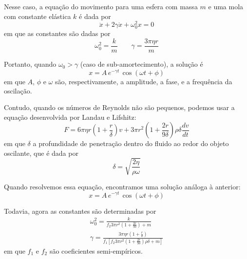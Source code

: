 \documentclass[a4paper, 12pt]{article}
\begin{document}
\begin{multicols}{2}
\begin{enumerate}
				\par Nesse caso, a equação do movimento para uma esfera com massa $m$ e uma mola com constante elástica $k$ é dada por
				\begin{equation}
					\ddot{x} + 2 \gamma \dot{x} + \omega_0^2 x = 0
				\end{equation}
				em que as constantes são dadas por
				\begin{equation}
					\omega_0^2 = \frac{k}{m} \qquad \gamma = \frac{3 \pi \eta r}{m}
				\end{equation}
				\par Portanto, quando $\omega_0 > \gamma$ (caso de sub-amortecimento), a solução é
				\begin{equation}
					x = A \, e^{- \gamma t} \, \cos (\omega t + \phi)
				\end{equation}
				em que $A$, $\phi$ e $\omega$ são, respectivamente, a amplitude, a fase, e a frequência da oscilação.
				\par Contudo, quando os números de Reynolds não são pequenos, podemos usar a equação desenvolvida por Landau e Lifshitz:
				\begin{equation}
					F = 6 \pi \eta r \left(1 + \frac{r}{\delta} \right) v + 3 \pi r^2 \left( 1 + \frac{2 r}{9 \delta} \right) \rho \delta \dfrac{d v}{d t}
				\end{equation}
				em que $\delta$ a profundidade de penetração dentro do fluido ao redor do objeto oscilante, que é dada por
				\begin{equation}
					\delta = \sqrt{\frac{2 \eta}{\rho \omega}}
				\end{equation}
				\par Quando resolvemos essa equação, encontramos uma solução análoga à anterior:
				\begin{equation}
					x = A \, e^{- \gamma t} \, \cos (\omega t + \phi)
				\end{equation}
				\par Todavia, agora as constantes são determinadas por
				\begin{equation} \begin{split}
					\omega_0^2 = \frac{k}{f_2 3 \pi r^2 \left(1 + \frac{2 r}{9 \delta} \right) + m} \\
					\gamma = \frac{3 \pi \eta r \left(1+ \frac{r}{\delta} \right)}{f_1 \left[ f_2 3 \pi r^2 \left(1+\frac{2 r}{9 \delta} \right) \rho \delta + m \right]}
				\end{split} \end{equation}
				em que $f_1$ e $f_2$ são coeficientes semi-empíricos.
				

\end{enumerate}
\end{multicols}
\end{document}
